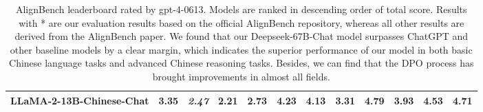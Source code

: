 \begin{table}[t]
{\begin{tabular}{@{}l|c|ccc|ccccccc@{}}
LLaMA-2-13B-Chinese-Chat       & \textbf{3.35}                     & \multicolumn{1}{c|}{\textit{2.47}}                                   & 2.21                                            & 2.73                                            & \multicolumn{1}{c|}{4.23}                                            & 4.13                                            & 3.31                                            & 4.79                                            & 3.93                                            & 4.53                                            & 4.71                                            \\ \bottomrule
\end{tabular}
}
\caption{AlignBench leaderboard rated by gpt-4-0613. Models are ranked in descending order of total score. Results with * are our evaluation results based on the official AlignBench repository, whereas all other results are derived from the AlignBench paper.
We found that our Deepseek-67B-Chat model surpasses ChatGPT and other baseline models by a clear margin,
which indicates the superior performance of our model in both basic Chinese language tasks and advanced Chinese reasoning tasks. 
Besides, we can find that the DPO process has brought improvements in almost all fields.
}
\label{tab:align_bench_results}
\end{table}

